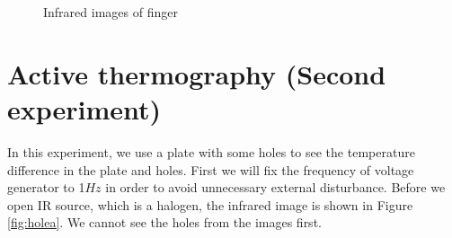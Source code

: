 \documentclass[english]{article}
\begin{document}
\begin{figure}[H]
	\centering
	\caption{Infrared images of finger}
	\label{fig:finger}
\end{figure}


\section{Active thermography (Second experiment)}

In this experiment, we use a plate with some holes to see the temperature difference in the plate and holes.
First we will fix the frequency of voltage generator to 1$Hz$ in order to avoid unnecessary external disturbance.
Before we open IR source, which is a halogen, the infrared image is shown in Figure \ref{fig:holea}.
We cannot see the holes from the images first. 
\end{document}
